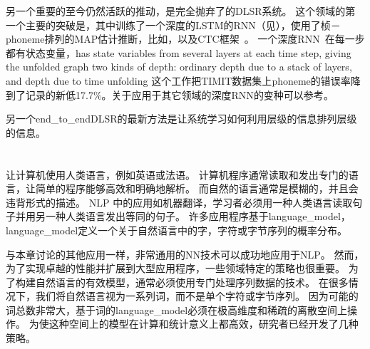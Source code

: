 另一个重要的至今仍然活跃的推动，是完全抛弃了的\gls{DL}\gls{SR}系统。
这个领域的第一个主要的突破是\citep{Graves-et-al-ICASSP2013}，其中训练了一个深度的\gls{LSTM}的\gls{RNN}（见），使用了桢－\gls{phoneme}排列的\gls{MAP}估计推断，比如\citet{chapter-gradient-document-2001}，以及CTC框架~\citep{Graves-et-al-2006,Graves-book2012}。
一个深度\gls{RNN}~\citep{Graves-et-al-ICASSP2013}在每一步都有状态变量，has state variables from several layers at each time step, giving the unfolded graph two kinds of depth: ordinary depth due to a stack of layers, and depth due to time unfolding
这个工作把TIMIT数据集上\gls{phoneme}的错误率降到了记录的新低17.7\%。关于应用于其它领域的深度\gls{RNN}的变种可以参考\citet{Pascanu-et-al-ICLR2014,Chung-et-al-NIPSDL2014-small}。

另一个\gls{end_to_end}\gls{DL}\gls{SR}的最新方法是让系统学习如何利用层级的信息排列层级的信息\citep{Chorowski-et-al-arxiv2014,llu_is2015b}。


\section{}
\label{sec: natural_language_processing}

 让计算机使用人类语言，例如英语或法语。
计算机程序通常读取和发出专门的语言，让简单的程序能够高效和明确地解析。
而自然的语言通常是模糊的，并且会违背形式的描述。
\gls{NLP} 中的应用如机器翻译，学习者必须用一种人类语言读取句子并用另一种人类语言发出等同的句子。
许多应用程序基于\gls{language_model}，\gls{language_model}定义一个关于自然语言中的字，字符或字节序列的概率分布。


与本章讨论的其他应用一样，非常通用的\gls{NN}技术可以成功地应用于\gls{NLP}。
然而，为了实现卓越的性能并扩展到大型应用程序，一些领域特定的策略也很重要。
为了构建自然语言的有效模型，通常必须使用专门处理序列数据的技术。
在很多情况下，我们将自然语言视为一系列词，而不是单个字符或字节序列。
因为可能的词总数非常大，基于词的\gls{language_model}必须在极高维度和稀疏的离散空间上操作。
为使这种空间上的模型在计算和统计意义上都高效，研究者已经开发了几种策略。

\subsection{}
\label{sec:n_grams}

